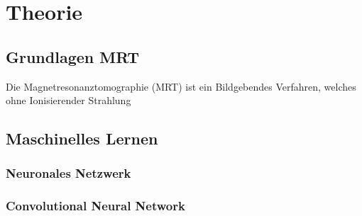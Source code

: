 \chapter{Theorie}

\section{Grundlagen MRT}
Die Magnetresonanztomographie (MRT) ist ein Bildgebendes Verfahren, welches ohne Ionisierender Strahlung


\section{Maschinelles Lernen}

\subsection{Neuronales Netzwerk}

\subsection{Convolutional Neural Network}